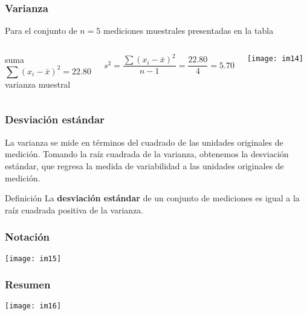 \documentclass[spanish]{beamer}
\begin{document}
\begin{frame}
\frametitle{Varianza}
Para el conjunto de $n = 5$ mediciones muestrales presentadas en la tabla
\begin{columns}
suma
\begin{equation*}
\sum {(x_{i}- \bar{x})}^2=22.80
\end{equation*}
varianza muestral

\begin{equation*}
s^2= \frac{\sum {(x_{i}- \bar{x})}^2}{n-1}= \frac{22.80}{4}=5.70
\end{equation*}

\begin{center}
\texttt{[image: im14]}
\end{center}
\end{columns}

\end{frame}
\begin{frame}
\frametitle{Desviación estándar}
La varianza se mide en términos del cuadrado de las unidades originales de medición. Tomando la raíz cuadrada de la varianza, obtenemos la desviación estándar, que regresa la medida de variabilidad a las unidades originales de medición.

\begin{block}{Definición}
La \textbf{desviación estándar} de un conjunto de mediciones es igual a la raíz
cuadrada positiva de la varianza.
\end{block}
\end{frame}
\begin{frame}
\frametitle{Notación}

\begin{center}
\texttt{[image: im15]}
\end{center}

\end{frame}
\begin{frame}
\frametitle{Resumen}

\begin{center}
\texttt{[image: im16]}
\end{center}

\end{frame}
\end{document}
